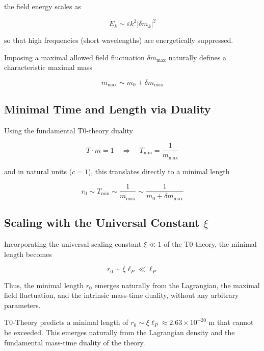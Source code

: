 \documentclass[12pt,a4paper]{article}
\numberwithin{equation}{section}
\begin{document}
	the field energy scales as
	
	\begin{equation}
		E_k \sim \varepsilon k^2 |\delta m_k|^2
	\end{equation}
	
	so that high frequencies (short wavelengths) are energetically suppressed.  
	
	Imposing a maximal allowed field fluctuation $\delta m_{\mathrm{max}}$ naturally defines a characteristic maximal mass
	
	\begin{equation}
		m_{\mathrm{max}} \sim m_0 + \delta m_{\mathrm{max}}
	\end{equation}
	
	\subsection{Minimal Time and Length via Duality}
	
	Using the fundamental T0-theory duality
	
	\begin{equation}
		T \cdot m = 1 \quad \Rightarrow \quad T_{\mathrm{min}} = \frac{1}{m_{\mathrm{max}}}
	\end{equation}
	
	and in natural units ($c = 1$), this translates directly to a minimal length
	
	\begin{equation}
		r_0 \sim T_{\mathrm{min}} \sim \frac{1}{m_{\mathrm{max}}} \sim \frac{1}{m_0 + \delta m_{\mathrm{max}}}
	\end{equation}
	
	\subsection{Scaling with the Universal Constant $\xi$}
	
	Incorporating the universal scaling constant $\xi \ll 1$ of the T0 theory, the minimal length becomes
	
	\begin{equation}
		r_0 \sim \xi \ell_P \ll \ell_P
	\end{equation}
	
	Thus, the minimal length $r_0$ emerges naturally from the Lagrangian, the maximal field fluctuation, and the intrinsic mass-time duality, without any arbitrary parameters.
\begin{revolutionary}
	T0-Theory predicts a minimal length of $r_0 \sim \xi \ell_P \approx 2.63 \times 10^{-20}$ m that cannot be exceeded. This emerges naturally from the Lagrangian density and the fundamental mass-time duality of the theory.
\end{revolutionary}
\end{document}
